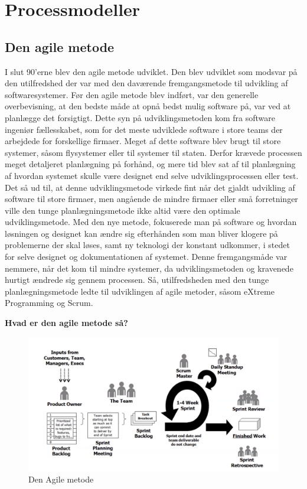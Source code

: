\chapter{Processmodeller}\label{ch:processmodeller}

\section{Den agile metode}
I slut 90’erne blev den agile metode udviklet\cite{Sommerville}. Den blev udviklet som modsvar på den utilfredshed der var med den daværende fremgangsmetode til udvikling af softwaresystemer. Før den agile metode blev indført, var den generelle overbevisning, at den bedste måde at opnå bedst mulig software på, var ved at planlægge det forsigtigt\cite{Sommerville}. Dette syn på udviklingsmetoden kom fra software ingeniør fællesskabet, som for det meste udviklede software i store teams der arbejdede for forskellige firmaer. Meget af dette software blev brugt til store systemer, såsom flysystemer eller til systemer til staten. Derfor krævede processen meget detaljeret planlægning på forhånd, og mere tid blev sat af til planlægning af hvordan systemet skulle være designet end selve udviklingsprocessen eller test\cite{Sommerville}.
Det så ud til, at denne udviklingsmetode virkede fint når det gjaldt udvikling af software til store firmaer, men angående de mindre firmaer eller små forretninger ville den tunge planlægningsmetode ikke altid være den optimale udviklingsmetode. Med den nye metode, fokuserede man på software og hvordan løsningen og designet kan ændre sig efterhånden som man bliver klogere på problemerne der skal løses, samt ny teknologi der konstant udkommer, i stedet for selve designet og dokumentationen af systemet. Denne fremgangsmåde var nemmere, når det kom til mindre systemer, da udviklingsmetoden og kravenede hurtigt ændrede sig gennem processen\cite{Sommerville}. 
Så, utilfredsheden med den tunge planlægningsmetode ledte til udviklingen af agile metoder, såsom eXtreme Programming og Scrum.


\textbf{Hvad er den agile metode så?}

\begin{figure}
    \includegraphics[width=\linewidth]{figures/AgileMetoder.png}
    \caption{Den Agile metode}
    \label{fig:Agil}
\end{figure}

